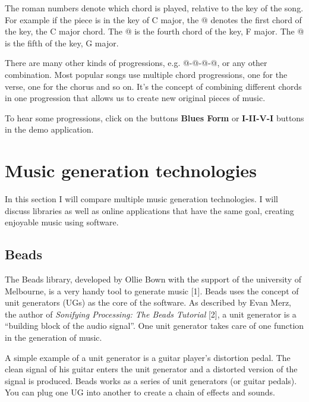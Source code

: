 \documentclass[12pt]{article}
\makeatletter
\newcommand*{\rom}[1]{\expandafter\@slowromancap\romannumeral #1@}
\makeatother
\begin{document}
The roman numbers denote which chord is played, relative to the key of the song. For example if the piece is in the key of C major, the \rom{1} denotes the first chord of the key, the C major chord. The \rom{4} is the fourth chord of the key, F major. The \rom{5} is the fifth of the key, G major.
\newline

There are many other kinds of progressions, e.g. \rom{1}-\rom{2}-\rom{5}-\rom{1}, or any other combination. Most popular songs use multiple chord progressions, one for the verse, one for the chorus and so on. It's the concept of combining different chords in one progression that allows us to create new original pieces of music.
\newline

To hear some progressions, click on the buttons \textbf{Blues Form} or \textbf{I-II-V-I} buttons in the demo application.

\section{Music generation technologies}

In this section I will compare multiple music generation technologies. I will discuss libraries as well as online applications that have the same goal, creating enjoyable music using software.

\subsection{Beads}
The Beads library, developed by Ollie Bown with the support of the university of Melbourne, is a very handy tool to generate music [1]. Beads uses the concept of unit generators (UGs) as the core of the software. As described by Evan Merz, the author of \textit{Sonifying Processing: The Beads Tutorial} [2], a unit generator is a ``building block of the audio signal''.  One unit generator takes care of one function in the generation of music. 
\newline

A simple example of a unit generator is a guitar player's distortion pedal. The clean signal of his guitar enters the unit generator and a distorted version of the signal is produced. Beads works as a series of unit generators (or guitar pedals). You can plug one UG into another to create a chain of effects and sounds.
\newline
\newline
\end{document}
